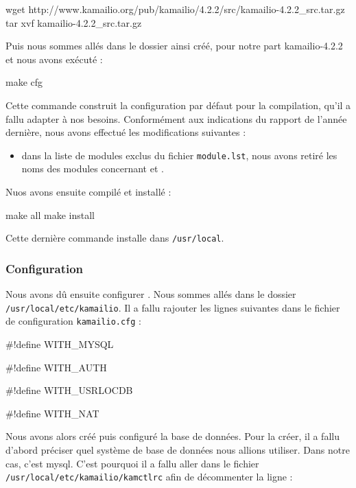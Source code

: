 \begin{shell}
wget http://www.kamailio.org/pub/kamailio/4.2.2/src/kamailio-4.2.2\_src.tar.gz
tar xvf kamailio-4.2.2\_src.tar.gz
\end{shell}

Puis nous sommes allés dans le dossier ainsi créé, pour notre part kamailio-4.2.2 et nous avons exécuté :

\begin{shell}
make cfg
\end{shell}

Cette commande construit la configuration par défaut pour la compilation, qu’il a fallu adapter à nos besoins. Conformément aux indications du rapport de l’année dernière, nous avons effectué les modifications suivantes :

\begin{itemize}
	\item{dans la liste de modules exclus du fichier \texttt{module.lst}, nous avons retiré les noms des modules concernant {\my} et {\rad}}.
\end{itemize}

Nuos avons ensuite compilé et installé {\kam} :
	
\begin{shell}
make all
make install
\end{shell}

Cette dernière commande installe {\kam} dans \texttt{/usr/local}.

\subsubsection{Configuration}

Nous avons dû ensuite configurer {\kam}. Nous sommes allés dans le dossier \texttt{/usr/local/etc/kamailio}. Il a fallu rajouter les lignes suivantes dans le fichier de configuration \texttt{kamailio.cfg} :

\#!define WITH\_MYSQL

\#!define WITH\_AUTH

\#!define WITH\_USRLOCDB

\#!define WITH\_NAT

Nous avons alors créé puis configuré la base de données. Pour la créer, il a fallu d'abord préciser quel système de base de données nous allions utiliser.
Dans notre cas, c'est mysql. C'est pourquoi il a fallu aller dans le fichier \texttt{/usr/local/etc/kamailio/kamctlrc} afin de décommenter la ligne :

